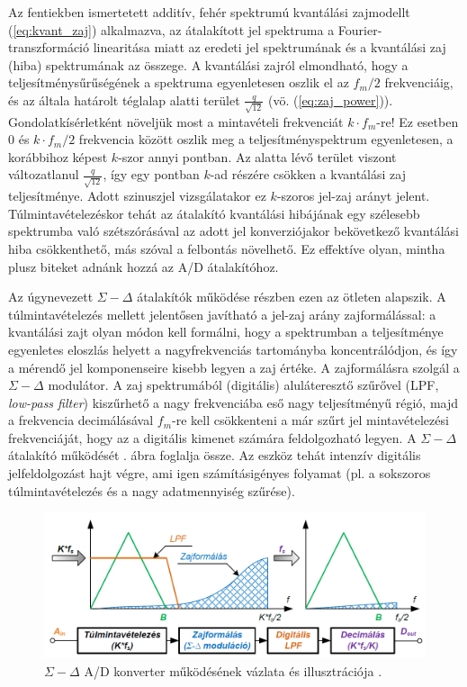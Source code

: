 \documentclass[12pt]{article}
\theoremstyle{plain}
\begin{document}
Az fentiekben ismertetett additív, fehér spektrumú kvantálási zajmodellt (\ref{eq:kvant_zaj}) alkalmazva, az átalakított jel spektruma a Fourier-transzformáció linearitása miatt az eredeti jel spektrumának és a kvantálási zaj (hiba) spektrumának az összege. A kvantálási zajról elmondható, hogy a teljesítménysűrűségének a spektruma egyenletesen oszlik el az $f_m/2$ frekvenciáig, és az általa határolt téglalap alatti terület $\frac{q}{\sqrt{12}}$ (vö. (\ref{eq:zaj_power})). Gondolatkísérletként növeljük most a mintavételi frekvenciát $k \cdot f_m$-re! Ez esetben 0 és $k \cdot f_m/2$ frekvencia között oszlik meg a teljesítményspektrum egyenletesen, a korábbihoz képest $k$-szor annyi pontban. Az alatta lévő terület viszont változatlanul $\frac{q}{\sqrt{12}}$, így egy pontban $k$-ad részére csökken a kvantálási zaj teljesítménye. Adott szinuszjel vizsgálatakor ez $k$-szoros jel-zaj arányt jelent.
Túlmintavételezéskor tehát az átalakító kvantálási hibájának egy szélesebb spektrumba való szétszórásával az adott jel konverziójakor bekövetkező kvantálási hiba csökkenthető, más szóval a felbontás növelhető. Ez effektíve olyan, mintha plusz biteket adnánk hozzá az A/D átalakítóhoz.

Az úgynevezett $\Sigma-\Delta$ átalakítók működése részben ezen az ötleten alapszik. A túlmintavételezés mellett jelentősen javítható a jel-zaj arány zajformálással: a kvantálási zajt olyan módon kell formálni, hogy a spektrumban a teljesítménye egyenletes eloszlás helyett a nagyfrekvenciás tartományba koncentrálódjon, és így a mérendő jel komponenseire kisebb legyen a zaj értéke. A zajformálásra szolgál a $\Sigma-\Delta$ modulátor. A zaj spektrumából (digitális) aluláteresztő szűrővel (LPF, \textit{low-pass filter}) kiszűrhető a nagy frekvenciába eső nagy teljesítményű régió, majd a frekvencia decimálásával $f_m$-re kell csökkenteni a már szűrt jel mintavételezési frekvenciáját, hogy az a digitális kimenet számára feldolgozható legyen. A $\Sigma-\Delta$ átalakító működését . ábra foglalja össze. Az eszköz tehát intenzív digitális jelfeldolgozást hajt végre, ami igen számításigényes folyamat (pl. a sokszoros túlmintavételezés és a nagy adatmennyiség szűrése).


\begin{figure}
	\centering
	\includegraphics[width=1\linewidth]{media/sigma_delta_flowchart}
	\caption{$\Sigma-\Delta$ A/D konverter működésének vázlata és illusztrációja \cite{BME}.}
	\label{fig:sigmadeltaflowchart}
\end{figure}
\end{document}
